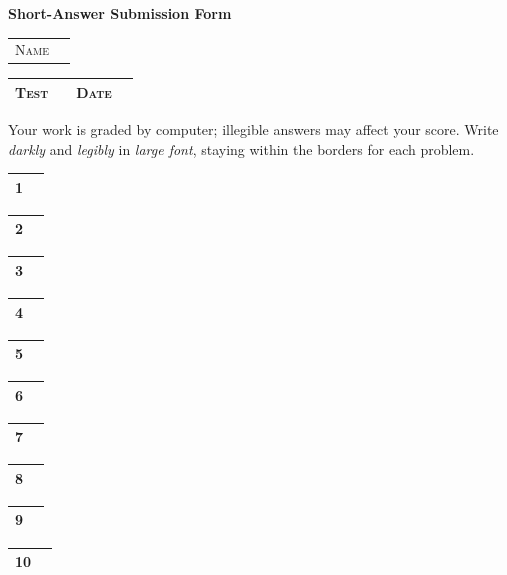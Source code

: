 \documentclass[11pt]{article}
\newcommand{\answerbox}[1]{
	\begin{tabular}{|m{0.3in}|m{2in}|}
		\hline
		\LARGE \bfseries #1 & \\[0.45in]
		\hline
	\end{tabular}
	\par\vspace{0.55in}
}
\begin{document}
\begin{center}
	{ \bfseries\huge Short-Answer Submission Form } \\[0.2in]
	\begin{tabular}{|m{1.2in}|m{4.95in}|}
		\hline
		\textsc{Name} & \\[0.4in]
	\end{tabular}
	\begin{tabular}{|m{0.6in}|m{3.6in}|m{0.6in}|m{1in}|}
		\hline
		\textsc{Test} & \hspace{4in} & \textsc{Date} & \\[0.4in] \hline
	\end{tabular}
\end{center}

\vspace{0.2in}
Your work is graded by computer;
illegible answers may affect your score.
Write \emph{darkly} and \emph{legibly} in \emph{large font},
staying within the borders for each problem.
\par\vspace{0.2in} 

\begin{center}
	\begin{minipage}[t]{2.8in}
		\answerbox{1}
		\answerbox{2}
		\answerbox{3}
		\answerbox{4}
		\answerbox{5}
	\end{minipage}
	\hspace{0.7in}
	\begin{minipage}[t]{2.8in}
		\answerbox{6}
		\answerbox{7}
		\answerbox{8}
		\answerbox{9}
		\answerbox{10}
	\end{minipage}
\end{center}
\end{document}
